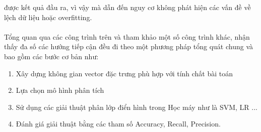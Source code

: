 được kết quả đầu ra, vì vậy mà dẫn đến nguy cơ không phát hiện các vấn đề về 
lệch dữ liệu hoặc overfitting.\\\\ 
Tổng quan qua các công trình trên và tham khảo một số công trình khác, nhận thấy 
đa số các hướng tiếp cận đều đi theo một phương pháp tổng quát chung và bao gồm 
các bước cơ bản như:
\begin{enumerate}
\item Xây dựng không gian vector đặc trưng phù hợp với tính chất bài toán
\item Lựa chọn mô hình phân tích
\item Sử dụng các giải thuật phân lớp điển hình trong Học máy như là 
SVM, LR ...
\item Đánh giá giải thuật bằng các tham số Accuracy, Recall, Precision.
\end{enumerate}